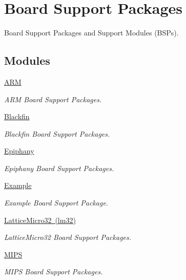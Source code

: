\hypertarget{group__RTEMSBSPs}{}\section{Board Support Packages}
\label{group__RTEMSBSPs}


Board Support Packages and Support Modules (B\+S\+Ps).  


\subsection*{Modules}
\begin{DoxyCompactItemize}
\item 
\mbox{\hyperlink{group__RTEMSBSPsARM}{A\+RM}}
\begin{DoxyCompactList}\small\item\em A\+RM Board Support Packages. \end{DoxyCompactList}\item 
\mbox{\hyperlink{group__RTEMSBSPsBfin}{Blackfin}}
\begin{DoxyCompactList}\small\item\em Blackfin Board Support Packages. \end{DoxyCompactList}\item 
\mbox{\hyperlink{group__RTEMSBSPsEpiphany}{Epiphany}}
\begin{DoxyCompactList}\small\item\em Epiphany Board Support Packages. \end{DoxyCompactList}\item 
\mbox{\hyperlink{group__RTEMSBSPsNoCPU}{Example}}
\begin{DoxyCompactList}\small\item\em Example Board Support Package. \end{DoxyCompactList}\item 
\mbox{\hyperlink{group__RTEMSBSPsLM32}{Lattice\+Micro32 (lm32)}}
\begin{DoxyCompactList}\small\item\em Lattice\+Micro32 Board Support Packages. \end{DoxyCompactList}\item 
\mbox{\hyperlink{group__RTEMSBSPsMIPS}{M\+I\+PS}}
\begin{DoxyCompactList}\small\item\em M\+I\+PS Board Support Packages. \end{DoxyCompactList}\item 

\end{DoxyCompactItemize}
